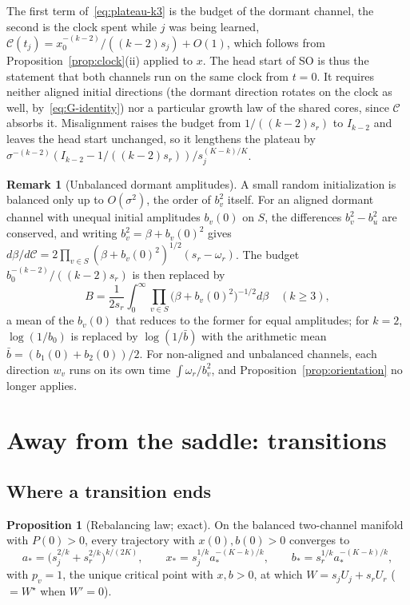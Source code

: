 \documentclass[11pt]{article}
\newcommand{\SO}{\textsf{SO}}
\newcommand{\Clk}{\mathcal{C}}
\theoremstyle{definition}
\newtheorem{proposition}[theorem]{Proposition}
\newtheorem{remark}[theorem]{Remark}
\numberwithin{equation}{section}
\begin{document}
The first term of~\eqref{eq:plateau-k3} is the budget of the dormant channel, the second is the clock spent while $j$ was being learned, $\Clk(t_j)=x_0^{-(k-2)}/((k-2)s_j)+O(1)$, which follows from Proposition~\ref{prop:clock}(ii) applied to $x$. The head start of \SO{} is thus the statement that both channels run on the same clock from $t=0$. It requires neither aligned initial directions (the dormant direction rotates on the clock as well, by~\eqref{eq:G-identity}) nor a particular growth law of the shared cores, since $\Clk$ absorbs it. Misalignment raises the budget from $1/((k-2)s_r)$ to $I_{k-2}$ and leaves the head start unchanged, so it lengthens the plateau by $\sigma^{-(k-2)}(I_{k-2}-1/((k-2)s_r))/s_j^{(K-k)/K}$.

\begin{remark}[Unbalanced dormant amplitudes]\label{rem:unbalanced}
A small random initialization is balanced only up to $O(\sigma^2)$, the order of $b_v^2$ itself. For an aligned dormant channel with unequal initial amplitudes $b_v(0)$ on $S$, the differences $b_v^2-b_u^2$ are conserved, and writing $b_v^2=\beta+b_v(0)^2$ gives $d\beta/d\Clk=2\prod_{v\in S}(\beta+b_v(0)^2)^{1/2}(s_r-\omega_r)$. The budget $b_0^{-(k-2)}/((k-2)s_r)$ is then replaced by
\[
B=\frac1{2s_r}\int_0^\infty\prod_{v\in S}\big(\beta+b_v(0)^2\big)^{-1/2}d\beta\quad(k\ge3),
\]
a mean of the $b_v(0)$ that reduces to the former for equal amplitudes; for $k=2$, $\log(1/b_0)$ is replaced by $\log(1/\bar b)$ with the arithmetic mean $\bar b=(b_1(0)+b_2(0))/2$. For non-aligned and unbalanced channels, each direction $w_v$ runs on its own time $\int\omega_r/b_v^2$, and Proposition~\ref{prop:orientation} no longer applies.
\end{remark}

\section{Away from the saddle: transitions}\label{sec:away}

\subsection{Where a transition ends}

\begin{proposition}[Rebalancing law; exact]\label{prop:rebalance}
On the balanced two-channel manifold with $P(0)>0$, every trajectory with $x(0),b(0)>0$ converges to
\begin{equation}\label{eq:rebalance}
a_*=\big(s_j^{2/k}+s_r^{2/k}\big)^{k/(2K)},\qquad x_*=s_j^{1/k}a_*^{-(K-k)/k},\qquad b_*=s_r^{1/k}a_*^{-(K-k)/k},
\end{equation}
with $p_v=1$, the unique critical point with $x,b>0$, at which $W=s_jU_j+s_rU_r$ ($=W^\star$ when $W'=0$).
\end{proposition}
\end{document}
